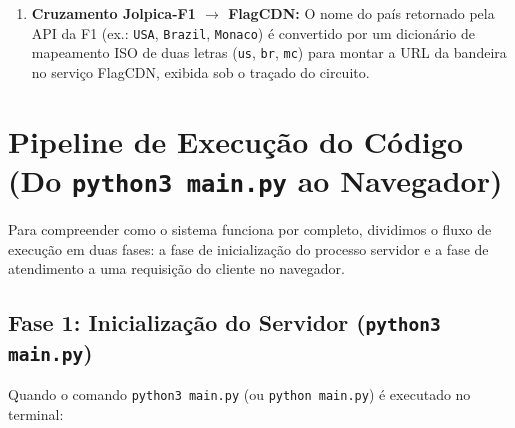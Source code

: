\documentclass[12pt]{article}
\begin{document}
\begin{enumerate}
    \begin{itemize}
        \item \texttt{/page/summary/\{titulo\}}: retorna o resumo histórico do circuito (\texttt{extract}) e a imagem principal (\texttt{thumbnail.source}), que nas páginas de circuitos corresponde ao diagrama vetorial do traçado da pista e, nas páginas de equipes, ao logotipo da escuderia.
        \item \texttt{/page/media-list/\{titulo\}}: retorna a lista de arquivos multimídia do Wikimedia Commons (livres de direitos autorais) presentes no artigo. Filtramos o primeiro arquivo fotográfico real (\texttt{.jpg}) em alta resolução para servir de plano de fundo do painel meteorológico.
    \end{itemize}
    \item \textbf{Cruzamento Jolpica-F1 $\rightarrow$ FlagCDN:} O nome do país retornado pela API da F1 (ex.: \texttt{USA}, \texttt{Brazil}, \texttt{Monaco}) é convertido por um dicionário de mapeamento ISO de duas letras (\texttt{us}, \texttt{br}, \texttt{mc}) para montar a URL da bandeira no serviço FlagCDN, exibida sob o traçado do circuito.
\end{enumerate}

\section{Pipeline de Execução do Código (Do \texttt{python3 main.py} ao Navegador)}

Para compreender como o sistema funciona por completo, dividimos o fluxo de execução em duas fases: a fase de inicialização do processo servidor e a fase de atendimento a uma requisição do cliente no navegador.

\subsection{Fase 1: Inicialização do Servidor (\texttt{python3 main.py})}

Quando o comando \texttt{python3 main.py} (ou \texttt{python main.py}) é executado no terminal:
\end{document}
